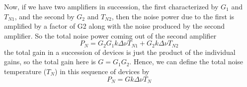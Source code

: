 \documentclass[10pt]{report}
\begin{document}
Now, if we have two amplifiers in succession, the first characterized by $G_1$ and $T_{N1}$, and the second by $G_2$ and $T_{N2}$, then the noise power due to the first is amplified by a factor of G2 along with the noise produced by the second amplifier.  So the total noise power coming out of the second amplifier 
\begin{equation}
P_N=G_2G_1k \Delta\nu T_{N1} + G_2k \Delta\nu T_{N2}
\end{equation}
 the total gain in a succession of devices is just the product of the individual gains, so the total gain here is $G = G_1 G_2$.  Hence, we can define the total noise temperature ($T_N$) in this sequence of devices by 
 \begin{equation}
 P_N=G k \Delta\nu T_N
 \end{equation}
 
\end{document}
